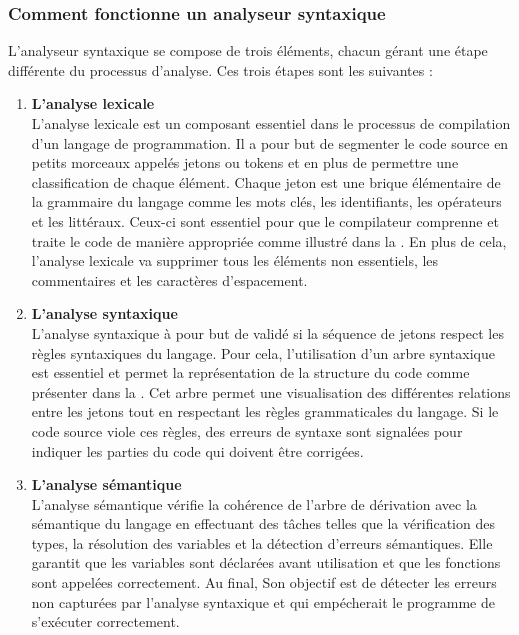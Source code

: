 \documentclass{rapport}
\begin{document}
\subsubsection{Comment fonctionne un analyseur syntaxique}
L'analyseur syntaxique se compose de trois éléments, chacun gérant une étape différente du processus d'analyse. Ces trois étapes sont les suivantes :
\begin{enumerate}
    \item \textbf{L'analyse lexicale}\\
    L'analyse lexicale est un composant essentiel dans le processus de compilation d'un langage de programmation. Il a pour but de segmenter le code source en petits morceaux appelés jetons ou tokens et en plus de permettre une classification de chaque élément. Chaque jeton est une brique élémentaire de la grammaire du langage comme les mots clés, les identifiants, les opérateurs et les littéraux. Ceux-ci sont essentiel pour que le compilateur comprenne et traite le code de manière appropriée comme illustré dans la . En plus de cela, l'analyse lexicale va supprimer tous les éléments non essentiels, les commentaires et les caractères d'espacement.
    \newpage
    \item \textbf{L'analyse syntaxique}\\
    L'analyse syntaxique à pour but de validé si la séquence de jetons respect les règles syntaxiques du langage. Pour cela, l'utilisation d'un arbre syntaxique est essentiel et permet la représentation de la structure du code comme présenter dans la . Cet arbre permet une visualisation des différentes relations entre les jetons tout en respectant les règles grammaticales du langage. Si le code source viole ces règles, des erreurs de syntaxe sont signalées pour indiquer les parties du code qui doivent être corrigées.
    \item \textbf{L'analyse sémantique}\\
    L'analyse sémantique vérifie la cohérence de l'arbre de dérivation avec la sémantique du langage en effectuant des tâches telles que la vérification des types, la résolution des variables et la détection d'erreurs sémantiques. Elle garantit que les variables sont déclarées avant utilisation et que les fonctions sont appelées correctement. Au final, Son objectif est de détecter les erreurs non capturées par l'analyse syntaxique et qui empécherait le programme de s'exécuter correctement.
\end{enumerate}
\end{document}
